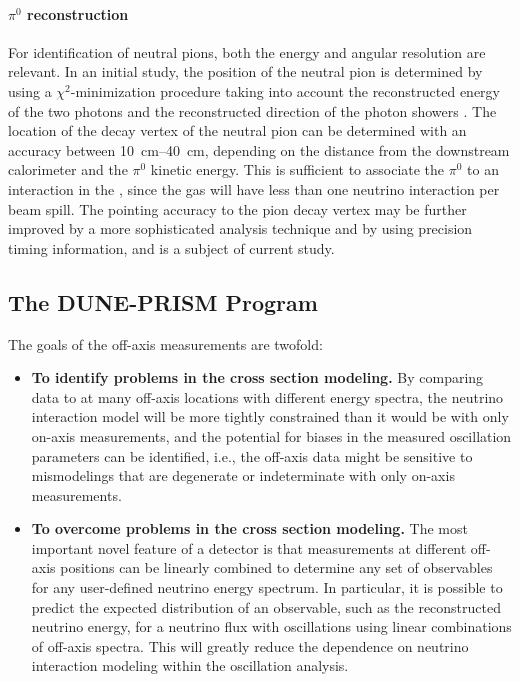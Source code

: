 \paragraph{$\pi^0$ reconstruction} For identification of neutral pions, both the energy and angular resolution are relevant. In an initial study, the position of the neutral pion is determined by using a $\chi^2$-minimization procedure taking into account the reconstructed energy of the two photons and the reconstructed direction of the photon showers \cite{Emberger:2018pgr}. The location of the decay vertex of the neutral pion can be determined with an accuracy between \SIrange{10}{40}{\cm}, depending on the distance from the downstream calorimeter and the $\pi^0$ kinetic energy. This is sufficient to associate the $\pi^0$ to an interaction in the , since the gas will have less than one neutrino interaction per beam spill.
The pointing accuracy to the pion decay vertex may be further improved by a more sophisticated analysis technique and by using precision timing information, and is a subject of current study.





\subsection{The DUNE-PRISM Program}
\label{sec:appx-nd:DP}



The goals of the off-axis measurements are twofold:
\begin{itemize}
\item {\bf To identify problems in the cross section modeling.} By comparing   data to  at many off-axis locations with different energy spectra, the neutrino interaction model will be more tightly constrained than it would be with only on-axis measurements, and the potential for biases in the measured oscillation parameters can be identified, i.e., the off-axis data might be sensitive to mismodelings that are degenerate or indeterminate with only on-axis measurements.
\item {\bf To overcome problems in the cross section modeling.} The most important novel feature of a  detector is that measurements at different off-axis positions can be linearly combined to determine any set of observables for any user-defined neutrino energy spectrum. In particular, it is possible to predict the expected distribution of an observable, such as the reconstructed neutrino energy, for a neutrino flux with oscillations  using linear combinations of   off-axis spectra.  This will greatly reduce the dependence on neutrino interaction modeling within the oscillation analysis.
\end{itemize}

